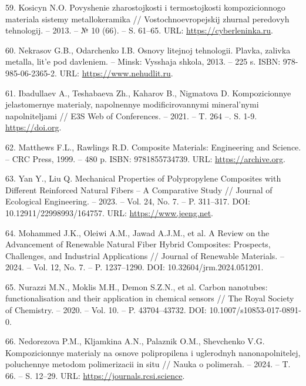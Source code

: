 \begin{references}
59. Kosicyn N.O. Povyshenie zharostojkosti i termostojkosti
kompozicionnogo materiala sistemy metallo\-keramika //
Vostochnoevropejskij zhurnal peredovyh tehnologij. – 2013. – № 10
(66). –
S. 61–65. URL: \href{https://cyberleninka.ru/article/n/povyshenie-zharostoykosti-i-termostoykosti-kompozitsionnogo-materiala-sistemy-metallkeramika}{https://cyberleninka.ru}.

60. Nekrasov G.B., Odarchenko I.B. Osnovy litejnoj tehnologii. Plavka,
zalivka metalla, lit'e pod davleniem. – Minsk: Vysshaja shkola,
2013. – 225 s. ISBN:
978-985-06-2365-2. URL: \href{https://www.nehudlit.ru/books/osnovy-tehnologii-liteynogo-proizvodstva.html}{https://www.nehudlit.ru}.

61. Ibadullaev A., Teshabaeva Zh., Kaharov B., Nigmatova
D. Kompozicionnye jelastomernye materialy, napolnennye
modificirovannymi mineral'nymi napolniteljami // E3S Web of
Conferences. – 2021. – T. 264
–. S. 1-9. \href{https://doi.org/10.1051/e3sconf/202126405006}{https://doi.org}.

62. Matthews F.L., Rawlings R.D. Composite Materials: Engineering and
Science. – CRC Press, 1999. – 480 p. ISBN:
9781855734739. URL: \href{https://archive.org/details/compositemateria0000matt_k6d9}{https://archive.org}.

63. Yan Y., Liu Q. Mechanical Properties of Polypropylene Composites
with Different Reinforced Natural Fibers – A Comparative Study //
Journal of Ecological Engineering. – 2023. – Vol. 24, No. 7. –
P. 311–317. DOI:
10.12911/22998993/164757. URL: \href{https://www.jeeng.net/Mechanical-Properties-of-Polypropylene-Composites-with-different-Reinforced-Natural\%2C164757\%2C0\%2C2.html}{https://www.jeeng.net}.

64. Mohammed J.K., Oleiwi A.M., Jawad A.J.M., et al. A Review on the
Advancement of Renewable Natural Fiber Hybrid Composites: Prospects,
Challenges, and Industrial Applications // Journal of Renew\-able
Materials. – 2024. – Vol. 12, No. 7. – P. 1237–1290. DOI:
10.32604/jrm.2024.051201.

65. Nurazzi M.N., Moklis M.H., Demon S.Z.N., et al. Carbon nanotubes:
functionalisation and their applic\-ation in chemical sensors // The
Royal Society of Chemistry. – 2020. – Vol. 10. – P. 43704–43732. DOI:
10.1007/s10853-017-0891-0.

66. Nedorezova P.M., Kljamkina A.N., Palaznik O.M., Shevchenko
V.G. Kompozicionnye materialy na osnove polipropilena i uglerodnyh
nanonapolnitelej, poluchennye metodom polimerizacii in situ // Nauka o
polimerah. – 2024. – T. 66. –
S. 12–29. URL: \href{https://journals.rcsi.science/2308-1139/article/view/266169?ysclid=m88hbaqgg240440584}{https://journals.rcsi.science}.


\end{references}
